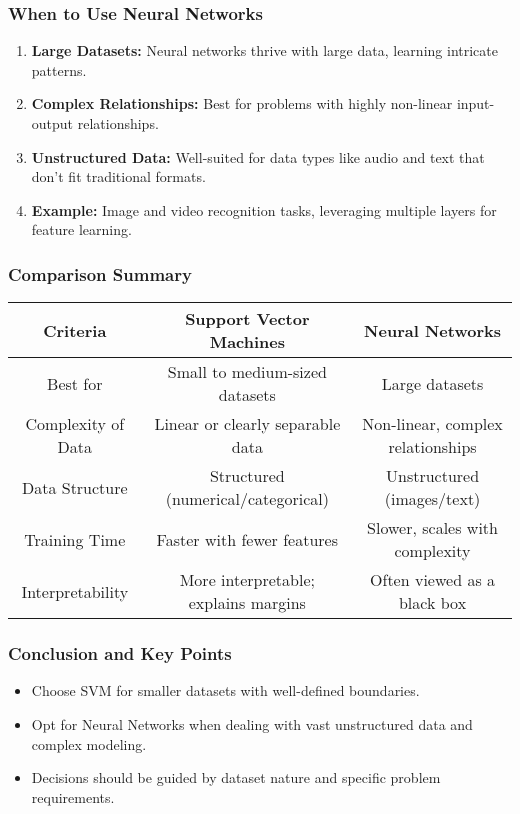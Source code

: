 \documentclass[aspectratio=169]{beamer}
\begin{document}
\begin{frame}[fragile]
    \frametitle{When to Use Neural Networks}
    \begin{enumerate}
        \item \textbf{Large Datasets:} Neural networks thrive with large data, learning intricate patterns.
        \item \textbf{Complex Relationships:} Best for problems with highly non-linear input-output relationships.
        \item \textbf{Unstructured Data:} Well-suited for data types like audio and text that don't fit traditional formats.
        \item \textbf{Example:} Image and video recognition tasks, leveraging multiple layers for feature learning.
    \end{enumerate}
\end{frame}

\begin{frame}[fragile]
    \frametitle{Comparison Summary}
    \begin{table}[h]
        \centering
        \begin{tabular}{|c|c|c|}
            \hline
            \textbf{Criteria} & \textbf{Support Vector Machines} & \textbf{Neural Networks} \\
            \hline
            Best for & Small to medium-sized datasets & Large datasets \\
            \hline
            Complexity of Data & Linear or clearly separable data & Non-linear, complex relationships \\
            \hline
            Data Structure & Structured (numerical/categorical) & Unstructured (images/text) \\
            \hline
            Training Time & Faster with fewer features & Slower, scales with complexity \\
            \hline
            Interpretability & More interpretable; explains margins & Often viewed as a black box \\
            \hline
        \end{tabular}
    \end{table}
\end{frame}

\begin{frame}[fragile]
    \frametitle{Conclusion and Key Points}
    \begin{itemize}
        \item Choose SVM for smaller datasets with well-defined boundaries.
        \item Opt for Neural Networks when dealing with vast unstructured data and complex modeling.
        \item Decisions should be guided by dataset nature and specific problem requirements.
    \end{itemize}
\end{frame}
\end{document}
